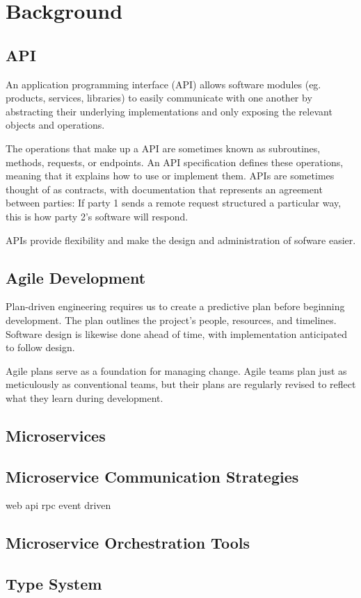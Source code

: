 
%

\chapter{Background}
\label{cha:background}

\section{API} %
\label{sec:api}

An application programming interface (API) allows software modules (eg. products, services, libraries)
to easily communicate with one another by abstracting their underlying implementations and only exposing the relevant objects and operations.

The operations that make up a API are sometimes known as subroutines, methods, requests, or endpoints.
An API specification defines these operations, meaning that it explains how to use or implement them.
APIs are sometimes thought of as contracts, with documentation that represents an agreement between parties:
If party 1 sends a remote request structured a particular way, this is how party 2’s software will respond.

APIs provide flexibility and make the design and administration of sofware  easier.

\section{Agile Development} %
\label{sec:agile_development}

Plan-driven engineering requires us to create a predictive plan before beginning development.
The plan outlines the project's people, resources, and timelines.
Software design is likewise done ahead of time, with implementation anticipated to follow design.

Agile plans serve as a foundation for managing change.
Agile teams plan just as meticulously as conventional teams, but their plans are regularly revised to reflect what they learn during development.

\section{Microservices} %
\label{sec:microservices}

\section{Microservice Communication Strategies} %
\label{sec:microservice_communication_strategies}
 web api
 rpc
 event driven

\section{Microservice Orchestration Tools} %
\label{sec:microservices}

\section{Type System} %
\label{sec:type_system}
